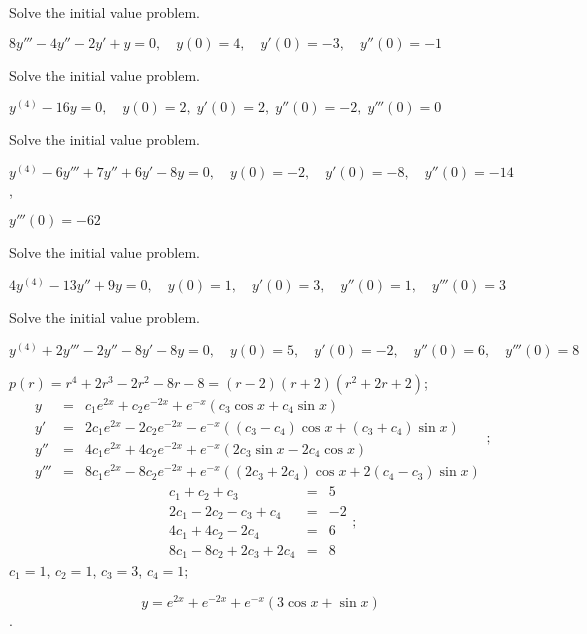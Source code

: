 \documentclass{ximera}
\begin{document}
\begin{problem}\label{exer:9.2.22}  Solve the
initial value problem.

$8y'''-4y''-2y'+y=0, \quad  y(0)=4,\quad y'(0)=-3,\quad y''(0)=-1$
\end{problem}

\begin{problem}\label{exer:9.2.23}  Solve the
initial value problem.

$y^{(4)}-16y=0, \quad   y(0)=2,\;  y'(0)=2,\;  y''(0)=-2,\;  y'''(0)=0$
\end{problem}

\begin{problem}\label{exer:9.2.24}  Solve the
initial value problem.

$y^{(4)}-6y'''+7y''+6y'-8y=0, \quad  y(0)=-2,\quad y'(0)=-8,\quad y''(0)=-14$,

 $y'''(0)=-62$
\end{problem}

\begin{problem}\label{exer:9.2.25}  Solve the
initial value problem.

$4y^{(4)}-13y''+9y=0, \quad  y(0)=1,\quad y'(0)=3,\quad y''(0)=1,\quad y'''(0)=3$
\end{problem}

\begin{problem}\label{exer:9.2.26}  Solve the
initial value problem.

$y^{(4)}+2y'''-2y''-8y'-8y=0, \quad  y(0)=5,\quad y'(0)=-2,\quad y''(0)=6,\quad y'''(0)=8$

\begin{solution}
$p(r)=r^4+2r^3-2r^2-8r-8=(r-2)(r+2)(r^2+2r+2)$;
$$
\begin{array}{lcl}
y&=&c_1e^{2x}+c_2e^{-2x}+e^{-x}(c_3\cos x+c_4\sin x)\\
y'&=&2c_1e^{2x}-2c_2e^{-2x}-e^{-x}((c_3-c_4)\cos x+(c_3+c_4)\sin x)\\
y''&=&4c_1e^{2x}+4c_2e^{-2x}+e^{-x}(2c_3\sin x-2c_4\cos x)\\
y'''&=&8c_1e^{2x}-8c_2e^{-2x}+e^{-x}((2c_3+2c_4)\cos x+2(c_4-c_3)\sin
x)
\end{array};
$$
$$
\begin{array}{rcr}
c_1+c_2+c_3&=&5\\
2c_1-2c_2-c_3+c_4&=&-2\\
4c_1+4c_2-2c_4&=&6\\
8c_1-8c_2+2c_3+2c_4&=&8
\end{array};
$$
$c_1=1$, $c_2=1$, $c_3=3$, $c_4=1$;

$$y=e^{2x}+e^{-2x}+e^{-x}(3\cos x+\sin x)$$.

\end{solution}
\end{problem}
\end{document}
